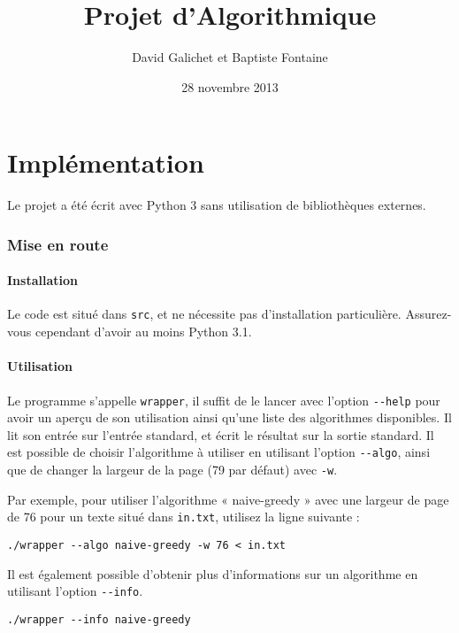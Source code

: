 \documentclass[a4paper, 11pt]{article}
\begin{document}
\title{Projet d'Algorithmique}
\author{David Galichet et Baptiste Fontaine}
\date{28 novembre 2013}
\maketitle

\part{Implémentation}

Le projet a été écrit avec Python 3 sans utilisation de bibliothèques externes.

\section{Mise en route}
\subsection{Installation}

Le code est situé dans \verb|src|, et ne nécessite pas d'installation
particulière. Assurez-vous cependant d'avoir au moins Python 3.1.

\subsection{Utilisation}

Le programme s'appelle \verb|wrapper|, il suffit de le lancer avec l'option
\verb|--help| pour avoir un aperçu de son utilisation ainsi qu'une liste des
algorithmes disponibles. Il lit son entrée sur l'entrée standard, et écrit le
résultat sur la sortie standard. Il est possible de choisir l'algorithme à
utiliser en utilisant l'option \verb|--algo|, ainsi que de changer la largeur
de la page (79 par défaut) avec \verb|-w|.

Par exemple, pour utiliser l'algorithme « naive-greedy » avec une largeur de
page de 76 pour un texte situé dans \verb|in.txt|, utilisez la ligne suivante :

\begin{verbatim}
./wrapper --algo naive-greedy -w 76 < in.txt
\end{verbatim}

Il est également possible d'obtenir plus d'informations sur un algorithme en
utilisant l'option \verb|--info|.

\begin{verbatim}
./wrapper --info naive-greedy
\end{verbatim}
\end{document}
